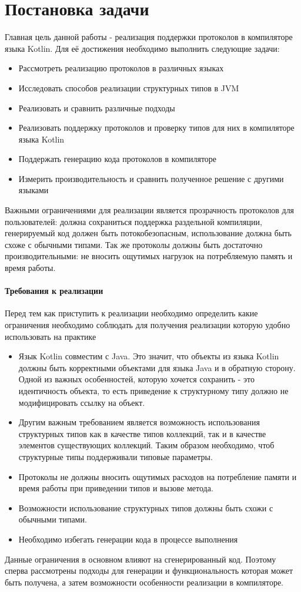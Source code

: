 \section*{Постановка задачи}
Главная цель данной работы - реализация поддержки протоколов в компиляторе языка Kotlin. Для её достижения необходимо выполнить следующие задачи:
\begin{itemize}
    \item Рассмотреть реализацию протоколов в различных языках
    \item Исследовать способов реализации структурных типов в JVM
    \item Реализовать и сравнить различные подходы
    \item Реализовать поддержку протоколов и проверку типов для них в компиляторе языка Kotlin
    \item Поддержать генерацию кода протоколов в компиляторе
    \item Измерить производительность и сравнить полученное решение с другими языками
\end{itemize}

Важными ограничениями для реализации является прозрачность протоколов для пользователей: должна сохраниться поддержка раздельной компиляции, генерируемый код должен быть потокобезопасным, использование должна быть схоже с обычными типами. Так же протоколы должны быть достаточно производительными: не вносить ощутимых нагрузок на потребляемую память и время работы.

\paragraph{Требования к реализации}
Перед тем как приступить к реализации необходимо определить какие ограничения необходимо соблюдать для получения реализации которую удобно использовать на практике

\begin{itemize}
\item Язык Kotlin совместим с Java. Это значит, что объекты из языка Kotlin должны быть корректными объектами для языка Java и в обратную сторону. Одной из важных особенностей, которую хочется сохранить - это идентичность объекта, то есть приведение к структурному типу должно не модифицировать ссылку на объект.
\item Другим важным требованием является возможность использования структурных типов как в качестве типов коллекций, так и в качестве элементов существующих коллекций. Таким образом необходимо, чтоб структурные типы поддерживали типовые параметры.
\item Протоколы не должны вносить ощутимых расходов на потребление памяти и время работы при приведении типов и вызове метода.
\item Возможности использование структурных типов должны быть схожи с обычными типами.
\item Необходимо избегать генерации кода в процессе выполнения
\end{itemize}

Данные ограничения в основном влияют на сгенерированный код. Поэтому сперва рассмотрены подходы для генерации и функциональность которая может быть получена, а затем возможности особенности реализации в компиляторе.
